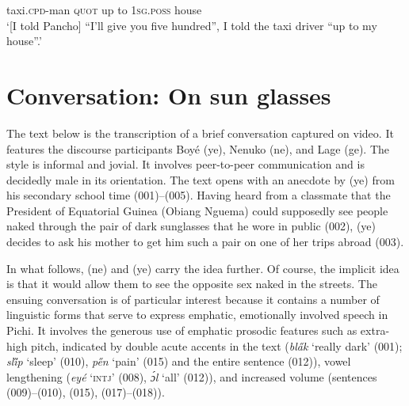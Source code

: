{taxi.\textsc{cpd}{}-man  \textsc{quot}     up        to  \textsc{1sg.poss}  house    \\
\glt
‘[I told Pancho] “I’ll give you five hundred”, I told the taxi driver “up to my house”.’
  }\z
\section{Conversation: On sun glasses}

The text below is the transcription of a brief conversation captured on video. It features the discourse participants Boyé (ye), Nenuko (ne), and Lage (ge). The style is informal and jovial. It involves peer-to-peer communication and is decidedly male in its orientation. The text opens with an anecdote by (ye) from his secondary school time (001)–(005). Having heard from a classmate that the President of Equatorial Guinea (Obiang Nguema) could supposedly see people naked through the pair of dark sunglasses that he wore in public (002), (ye) decides to ask his mother to get him such a pair on one of her trips abroad (003). 


In what follows, (ne) and (ye) carry the idea further. Of course, the implicit idea is that it would allow them to see the opposite sex naked in the streets. The ensuing conversation is of particular interest because it contains a number of linguistic forms that serve to express emphatic, emotionally involved speech in Pichi. It involves the generous use of emphatic prosodic features such as extra-high pitch, indicated by double acute accents in the text (\textit{bl\H{a}k} ‘really dark’ (001); \textit{sl\H{i}p} ‘sleep’ (010), \textit{p\H{e}n} ‘pain’ (015) and the entire sentence (012)), vowel lengthening (\textit{eyé} ‘\textsc{intj}’ (008), \textit{ɔ́l} ‘all’ (012)), and increased volume (sentences (009)–(010), (015), (017)–(018)). 



